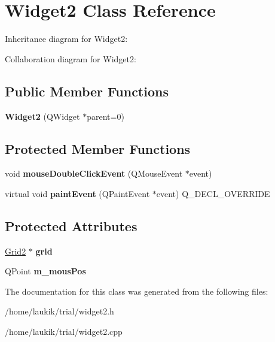 \hypertarget{classWidget2}{}\section{Widget2 Class Reference}
\label{classWidget2}


Inheritance diagram for Widget2\+:


Collaboration diagram for Widget2\+:
\subsection*{Public Member Functions}
\begin{DoxyCompactItemize}
\item 
\mbox{\label{classWidget2_a5263633ffe018b79586b40f79e45513b}} 
{\bfseries Widget2} (Q\+Widget $\ast$parent=0)
\end{DoxyCompactItemize}
\subsection*{Protected Member Functions}
\begin{DoxyCompactItemize}
\item 
\mbox{\label{classWidget2_a969f46a069e1e528d0e06d80bee13fac}} 
void {\bfseries mouse\+Double\+Click\+Event} (Q\+Mouse\+Event $\ast$event)
\item 
\mbox{\label{classWidget2_a594076f1101f6093e821f1f07bdfaad6}} 
virtual void {\bfseries paint\+Event} (Q\+Paint\+Event $\ast$event) Q\+\_\+\+D\+E\+C\+L\+\_\+\+O\+V\+E\+R\+R\+I\+DE
\end{DoxyCompactItemize}
\subsection*{Protected Attributes}
\begin{DoxyCompactItemize}
\item 
\mbox{\label{classWidget2_a01b6c7c66a3383a24c2c7081a2c99bfd}} 
\hyperlink{classGrid2}{Grid2} $\ast$ {\bfseries grid}
\item 
\mbox{\label{classWidget2_a93946d2441765a9e15a4754ea85bdea4}} 
Q\+Point {\bfseries m\+\_\+mous\+Pos}
\end{DoxyCompactItemize}


The documentation for this class was generated from the following files\+:\begin{DoxyCompactItemize}
\item 
/home/laukik/trial/widget2.\+h\item 
/home/laukik/trial/widget2.\+cpp\end{DoxyCompactItemize}
